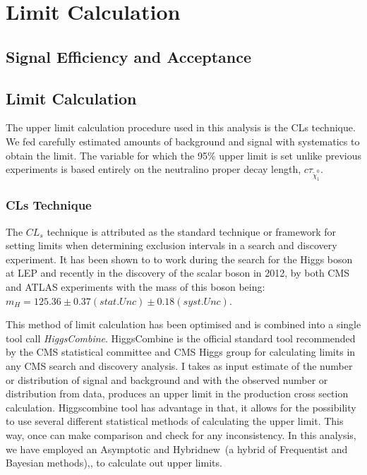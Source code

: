\chapter{Limit Calculation}
\label{Limit_Setting}
\section{Signal Efficiency and Acceptance}


\section{Limit Calculation}
The upper limit calculation procedure used in this analysis is the CLs technique. We fed carefully estimated amounts 
of background and signal with systematics to obtain the limit.
The variable for which the 95\% upper limit is set unlike previous experiments is based entirely on the neutralino proper decay length, $c\tau_{\tilde{\chi}^{0}_{1}}$. 

\subsection{CLs Technique}
The $CL_{s}$ technique \cite{CLS} is attributed as the standard technique or framework for setting limits when determining exclusion intervals in a search and discovery experiment. It has been shown to to work during the search for the Higgs boson at LEP and recently in the discovery of the scalar boson in 2012, by both CMS and ATLAS experiments with the mass of this boson being: $m_{H} = 125.36\pm 0.37(stat.Unc)\pm0.18(syst.Unc)$.

This method of limit calculation has been optimised and is combined into a single tool call \textit{HiggsCombine}.
HiggsCombine \cite{LIMIT} is the official standard tool recommended by the CMS statistical committee and CMS Higgs group for calculating limits in any CMS search and discovery analysis.
I takes as input estimate of the number or distribution of signal and background and with the observed number or distribution from data, produces an upper limit in the production cross section calculation.
Higgscombine tool has advantage in that, it allows for the possibility to use several different statistical methods of calculating the upper limit. This way, once can make comparison and check for any inconsistency. In this analysis, we have employed an Asymptotic \cite{ASYMP} and Hybridnew~(a hybrid of Frequentist  and Bayesian methods),\cite{LIMIT}, to calculate out upper limits. 



